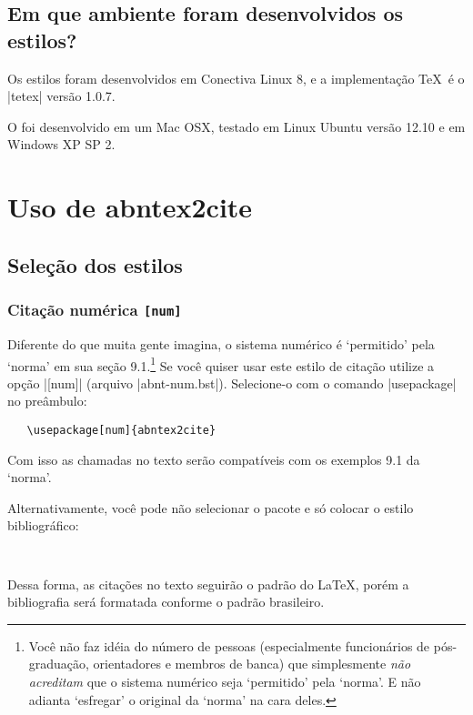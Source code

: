 \documentclass[a4paper]{ltxdoc}
\begin{document}
\subsection{Em que ambiente foram desenvolvidos os estilos?}

Os estilos foram desenvolvidos em Conectiva Linux 8, e a implementação \TeX\ é
o |tetex| versão 1.0.7.

O  foi desenvolvido em um Mac OSX, testado em Linux Ubuntu versão 12.10
e em Windows XP SP 2.

\section{Uso de \textsf{abntex2cite}}

\subsection{Seleção dos estilos}

\subsubsection{Citação numérica \tt{[num]}}

\DescribeMacro{\usepackage[num]{abntex2cite}}
Diferente do que muita gente imagina, o sistema numérico é `permitido'  pela
`norma'\cite{NBR6023:2000} em sua seção 9.1.\footnote{Você não faz idéia do
número de pessoas (especialmente funcionários de pós-graduação, orientadores e
membros de banca) que simplesmente \emph{não acreditam} que o sistema numérico
seja `permitido' pela `norma'. E não adianta `esfregar' o original da `norma' na
cara deles.} Se você quiser usar este estilo de citação utilize a opção |[num]|
(arquivo |abnt-num.bst|). Selecione-o com o comando |usepackage| no preâmbulo:

\begin{verbatim}
   \usepackage[num]{abntex2cite}
\end{verbatim}

Com isso as chamadas no texto serão compatíveis com os exemplos 9.1 da
`norma'\cite{NBR6023:2000}.

\DescribeMacro{}
Alternativamente, você pode não selecionar o pacote e só colocar o estilo
bibliográfico:

\begin{verbatim}
    
\end{verbatim}

Dessa forma, as citações no texto seguirão o padrão do \LaTeX, porém a
bibliografia será formatada conforme o padrão brasileiro.
\end{document}
